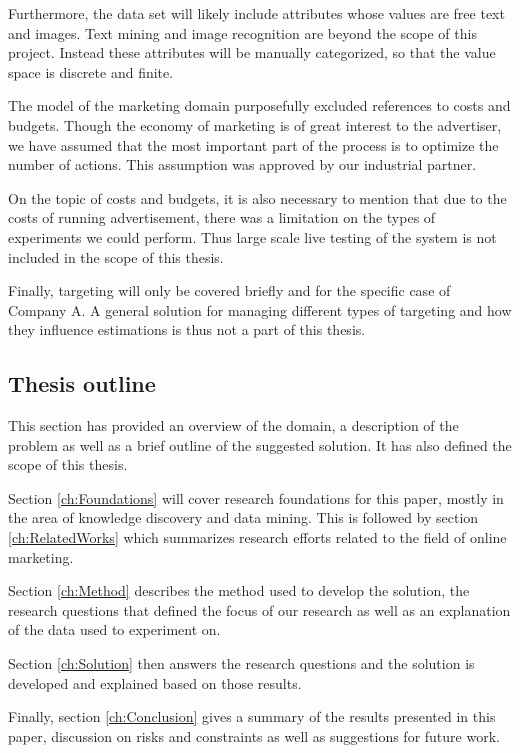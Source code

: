 \documentclass{sig-alternate}
\begin{document}
Furthermore, the data set will likely include attributes whose values are free text and images. Text mining and image recognition are beyond the scope of this project. Instead these attributes will be manually categorized, so that the value space is discrete and finite.

The model of the marketing domain purposefully excluded references to costs and budgets. Though the economy of marketing is of great interest to the advertiser, we have assumed that the most important part of the process is to optimize the number of actions. This assumption was approved by our industrial partner.

On the topic of costs and budgets, it is also necessary to mention that due to the costs of running advertisement, there was a limitation on the types of experiments we could perform. Thus large scale live testing of the system is not included in the scope of this thesis.

Finally, targeting will only be covered briefly and for the specific case of Company A. A general solution for managing different types of targeting and how they influence estimations is thus not a part of this thesis.

\subsection{Thesis outline}
This section has provided an overview of the domain, a description of the problem as well as a brief outline of the suggested solution. It has also defined the scope of this thesis.

Section \ref{ch:Foundations} will cover research foundations for this paper, mostly in the area of knowledge discovery and data mining. This is followed by section \ref{ch:RelatedWorks} which summarizes research efforts related to the field of online marketing.

Section \ref{ch:Method} describes the method used to develop the solution, the research questions that defined the focus of our research as well as an explanation of the data used to experiment on.

Section \ref{ch:Solution} then answers the research questions and the solution is developed and explained based on those results.

Finally, section \ref{ch:Conclusion} gives a summary of the results presented in this paper, discussion on risks and constraints as well as suggestions for future work.
\end{document}
